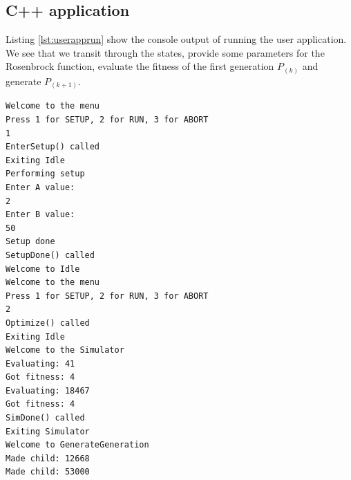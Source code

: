 \subsection{C++ application}

Listing \ref{lst:userapprun} show the console output of running the user application. We see that we transit through the states, provide some parameters for the Rosenbrock function, evaluate the fitness of the first generation $P_{(k)}$ and generate $P_{(k+1)}$.

\begin{lstlisting}[caption=Running the user application.,label={lst:userapprun},frame=single]
Welcome to the menu
Press 1 for SETUP, 2 for RUN, 3 for ABORT
1
EnterSetup() called
Exiting Idle
Performing setup
Enter A value:
2
Enter B value:
50
Setup done
SetupDone() called
Welcome to Idle
Welcome to the menu
Press 1 for SETUP, 2 for RUN, 3 for ABORT
2
Optimize() called
Exiting Idle
Welcome to the Simulator
Evaluating: 41
Got fitness: 4
Evaluating: 18467
Got fitness: 4
SimDone() called
Exiting Simulator
Welcome to GenerateGeneration
Made child: 12668
Made child: 53000
\end{lstlisting}

